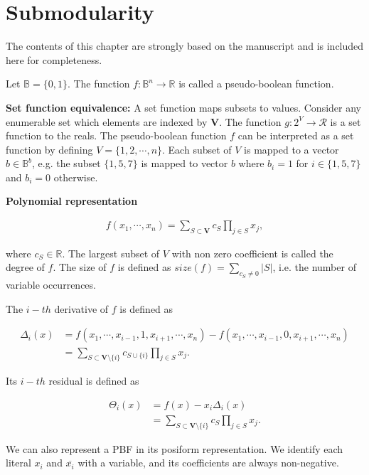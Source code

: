 \chapter{Submodularity}\label{app:submodularity}

The contents of this chapter are strongly based on the manuscript \cite{} and is included here for completeness.

Let $\mathbb{B} = \{0,1\}$. The function $f:\mathbb{B}^n\rightarrow\mathbb{R}$ is called a pseudo-boolean function.

\textbf{Set function equivalence:} A set function maps subsets to values. Consider any enumerable set which elements are indexed by $\mathbf{V}$. The function $g:2^V\rightarrow \mathcal{R}$ is a set function to the reals. The pseudo-boolean function $f$ can be interpreted as a set function by defining $V=\{1,2,\cdots,n\}$. Each subset of $V$ is mapped to a vector $b \in \mathbb{B}^b$, e.g. the subset $\{1,5,7\}$ is mapped to vector $b$ where $b_i=1$ for $i \in \{1,5,7\}$ and $b_i=0$ otherwise.

\textbf{Polynomial representation}

\begin{align*}
	f(x_1,\cdots, x_n) = \sum_{S \subset \mathbf{V}}{c_S\prod_{j \in S}{x_j}},
\end{align*}

where $c_S \in \mathbb{R}$. The largest subset of $V$ with non zero coefficient is called the degree of $f$. The size of $f$ is defined as $size(f) = \sum_{c_S \neq 0}{|S|}$, i.e. the number of variable occurrences. 

The $i-th$ derivative of $f$ is defined as

\begin{align*}
	\Delta_i(x) &= f(x_1,\cdots, x_{i-1},1,x_{i+1},\cdots,x_n) - f(x_1,\cdots, x_{i-1},0,x_{i+1},\cdots,x_n) \\
	&= \sum_{S \subset \mathbf{V} \setminus \{i\}}{c_{S \cup \{i\}}\prod_{j \in S}{x_j}}.
\end{align*}

Its $i-th$ residual is defined as

\begin{align*}
	\Theta_i(x) &= f(x) - x_i\Delta_i(x) \\
	&= \sum_{S \subset \mathbf{V} \setminus \{i\}}{c_{S}\prod_{j \in S}{x_j}}.	
\end{align*}

We can also represent a PBF in its posiform representation. We identify each literal $x_i$ and $\overline{x_i}$ with a variable, and its coefficients are always non-negative.

